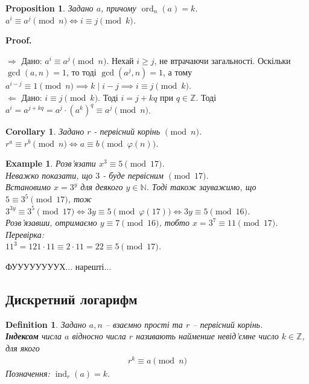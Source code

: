 \documentclass[a4paper, 14pt]{extarticle}
\makeatletter
\theoremstyle{theoremdd}
\theoremstyle{theoremdd}
\newtheorem{definition}[theorem]{Definition}
\theoremstyle{theoremdd}
\theoremstyle{theoremdd}
\newtheorem{example}[theorem]{Example}
\theoremstyle{theoremdd}
\newtheorem{proposition}[theorem]{Proposition}
\theoremstyle{theoremdd}
\theoremstyle{theoremdd}
\theoremstyle{theoremdd}
\newtheorem{corollary}[theorem]{Corollary}
\def\qed{$\blacksquare$}
\def\rightproof{$\boxed{\Rightarrow}$ }
\def\leftproof{$\boxed{\Leftarrow}$ }
\renewenvironment{proof}[1][Proof.\\]{\par
\pushQED{\hfill \qed}%
\normalfont \topsep6\p@\@plus6\p@\relax
\trivlist
\item\relax
{\bfseries
#1\@addpunct{.}}\hspace\labelsep\ignorespaces
}{%
\popQED\endtrivlist\@endpefalse
}
\DeclareMathOperator{\ord}{ord}
\DeclareMathOperator{\ind}{ind}
\makeatother
\begin{document}
\begin{proposition}
Задано $a$, причому $\ord_n (a) = k$.\\
$a^i \equiv a^j \pmod n \iff i \equiv j \pmod k$.
\end{proposition}

\begin{proof}
\rightproof Дано: $a^i \equiv a^j \pmod n$. Нехай $i \geq j$, не втрачаючи загальності. Оскільки $\gcd(a,n) = 1$, то тоді $\gcd(a^j,n)=1$, а тому\\
$a^{i-j} \equiv 1 \pmod n \implies k \mid i-j \implies i \equiv j \pmod k$.
\bigskip \\
\leftproof Дано: $i \equiv j \pmod k$. Тоді $i = j + k q$ при $q \in \mathbb{Z}$. Тоді\\
$a^i = a^{j+kq} = a^j \cdot (a^k)^q \equiv a^j \pmod n$.
\end{proof}

\begin{corollary}
Задано $r$ - первісний корінь $\pmod n$.\\
$r^a \equiv r^b \pmod n \iff a \equiv b \pmod {\varphi(n)}$.
\end{corollary}

\begin{example}
Розв'язати $x^3 \equiv 5 \pmod {17}$.\\
Неважко показати, що $3$ - буде первісним $\!\! \pmod {17}$.\\
Встановимо $x = 3^y$ для деякого $y \in \mathbb{N}$. Тоді також зауважимо, що $5 \equiv 3^5 \pmod {17}$, тож\\
$3^{3y} \equiv 3^5 \pmod {17} \iff 3y \equiv 5 \pmod {\varphi(17)} \iff 3y \equiv 5 \pmod {16}$.\\
Розв'язавши, отримаємо $y \equiv 7 \pmod {16}$, тобто $x = 3^7 \equiv 11 \pmod {17}$.\\
Перевірка:\\
$11^3 = 121 \cdot 11 \equiv 2 \cdot 11 = 22 \equiv 5 \pmod {17}$.
\end{example}

ФУУУУУУУУХ... нарешті...

\subsection{Дискретний логарифм}
\begin{definition}
Задано $a,n$ -- взаємно прості та $r$ -- первісний корінь.\\
\textbf{Індексом} числа $a$ відносно числа $r$ називають найменше невід'ємне число $k \in \mathbb{Z}$, для якого
\begin{align*}
r^k \equiv a \pmod n
\end{align*}
Позначення: $\ind_r (a) = k$.
\end{definition}
\end{document}
